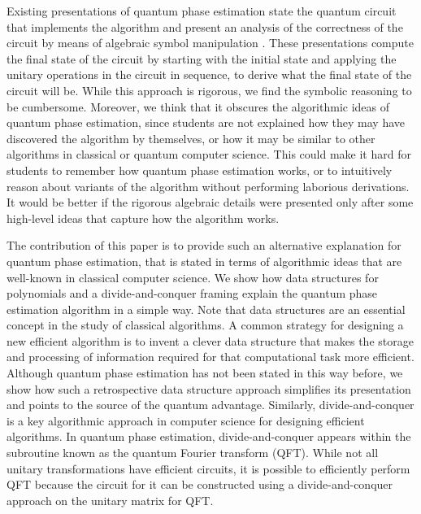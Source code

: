 \documentclass[prb,preprint]{revtex4}
\begin{document}
Existing presentations of quantum phase estimation state the quantum circuit that implements the algorithm and present an analysis of the correctness of the circuit by means of algebraic symbol manipulation \cite{nielsen2010quantum, wong2022introduction}. These presentations compute the final state of the circuit by starting with the initial state and applying the unitary operations in the circuit in sequence, to derive what the final state of the circuit will be. While this approach is rigorous, we find the symbolic reasoning to be cumbersome. Moreover, we think that it obscures the algorithmic ideas of quantum phase estimation, since students are not explained how they may have discovered the algorithm by themselves, or how it may be similar to other algorithms in classical or quantum computer science. This could make it hard for students to remember how quantum phase estimation works, or to intuitively reason about variants of the algorithm without performing laborious derivations. It would be better if the rigorous algebraic details were presented only after some high-level ideas that capture how the algorithm works.

The contribution of this paper is to provide such an alternative explanation for quantum phase estimation, that is stated in terms of algorithmic ideas that are well-known in classical computer science. We show how data structures for polynomials and a divide-and-conquer framing explain the quantum phase estimation algorithm in a simple way. Note that data structures are an essential concept in the study of classical algorithms. A common strategy for designing a new efficient algorithm is to invent a clever data structure that makes the storage and processing of information required for that computational task more efficient. Although quantum phase estimation has not been stated in this way before, we show how such a retrospective data structure approach simplifies its presentation and points to the source of the quantum advantage. Similarly, divide-and-conquer is a key algorithmic approach in computer science for designing efficient algorithms. In quantum phase estimation, divide-and-conquer appears within the subroutine known as the quantum Fourier transform (QFT). While not all unitary transformations have efficient circuits, it is possible to efficiently perform QFT because the circuit for it can be constructed using a divide-and-conquer approach on the unitary matrix for QFT. 
\end{document}
